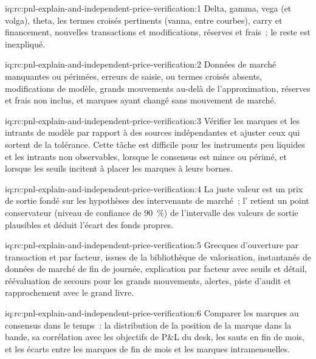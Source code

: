 \begin{solution}{iq:rc:pnl-explain-and-independent-price-verification:1}
Delta, gamma, vega (et volga), theta, les termes croisés pertinents (vanna,  entre courbes), carry et financement,
nouvelles transactions et modifications, réserves et frais~; le reste est inexpliqué.
\end{solution}

\begin{solution}{iq:rc:pnl-explain-and-independent-price-verification:2}
Données de marché manquantes ou périmées, erreurs de saisie,  ou termes croisés absents, modifications de modèle,
grands mouvements au-delà de l'approximation, réserves et frais non inclus, et marques ayant changé sans mouvement
de marché.
\end{solution}

\begin{solution}{iq:rc:pnl-explain-and-independent-price-verification:3}
Vérifier les marques et les intrants de modèle par rapport à des sources indépendantes et ajuster ceux qui sortent de la tolérance. Cette tâche est
difficile pour les instruments peu liquides et les intrants non observables, lorsque le consensus est mince ou périmé, et lorsque les seuils
incitent à placer les marques à leurs bornes.
\end{solution}

\begin{solution}{iq:rc:pnl-explain-and-independent-price-verification:4}
La juste valeur est un prix de sortie fondé sur les hypothèses des intervenants de marché~; l' retient un point conservateur
(niveau de confiance de 90~\%) de l'intervalle des valeurs de sortie plausibles et déduit l'écart des fonds propres.
\end{solution}

\begin{solution}{iq:rc:pnl-explain-and-independent-price-verification:5}
Grecques d'ouverture par transaction et par facteur, issues de la bibliothèque de valorisation, instantanés de données de marché de fin de journée,
explication par facteur avec seuils et détail, réévaluation de secours pour les grands mouvements, alertes,
piste d'audit et rapprochement avec le grand livre.
\end{solution}

\begin{solution}{iq:rc:pnl-explain-and-independent-price-verification:6}
Comparer les marques au consensus dans le temps~: la distribution de la position de la marque dans la bande, sa
corrélation avec les objectifs de P\&L du desk, les sauts en fin de mois, et les écarts entre les marques de fin de mois et
les marques intramensuelles.
\end{solution}
